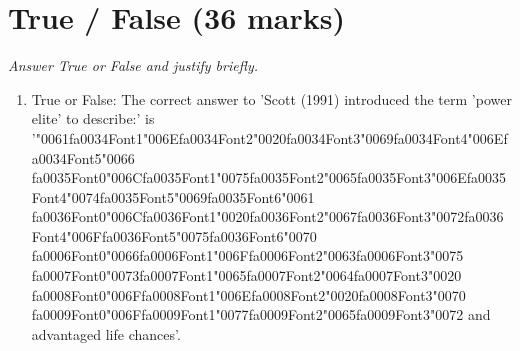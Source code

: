 \documentclass[12pt]{article}
\begin{document}
\section*{True / False (36 marks)}
\textit{Answer True or False and justify briefly.}
\begin{enumerate}[label=\arabic*.]
\item True or False: The correct answer to 'Scott (1991) introduced the term 'power elite' to describe:' is '{\char"0061}{\csname fa0034Font1\endcsname\char"006E}{\csname fa0034Font2\endcsname\char"0020}{\csname fa0034Font3\endcsname\char"0069}{\csname fa0034Font4\endcsname\char"006E}{\csname fa0034Font5\endcsname\char"0066} {\csname fa0035Font0\endcsname\char"006C}{\csname fa0035Font1\endcsname\char"0075}{\csname fa0035Font2\endcsname\char"0065}{\csname fa0035Font3\endcsname\char"006E}{\csname fa0035Font4\endcsname\char"0074}{\csname fa0035Font5\endcsname\char"0069}{\csname fa0035Font6\endcsname\char"0061} {\csname fa0036Font0\endcsname\char"006C}{\csname fa0036Font1\endcsname\char"0020}{\csname fa0036Font2\endcsname\char"0067}{\csname fa0036Font3\endcsname\char"0072}{\csname fa0036Font4\endcsname\char"006F}{\csname fa0036Font5\endcsname\char"0075}{\csname fa0036Font6\endcsname\char"0070} {\csname fa0006Font0\endcsname\char"0066}{\csname fa0006Font1\endcsname\char"006F}{\csname fa0006Font2\endcsname\char"0063}{\csname fa0006Font3\endcsname\char"0075} {\csname fa0007Font0\endcsname\char"0073}{\csname fa0007Font1\endcsname\char"0065}{\csname fa0007Font2\endcsname\char"0064}{\csname fa0007Font3\endcsname\char"0020} {\csname fa0008Font0\endcsname\char"006F}{\csname fa0008Font1\endcsname\char"006E}{\csname fa0008Font2\endcsname\char"0020}{\csname fa0008Font3\endcsname\char"0070} {\csname fa0009Font0\endcsname\char"006F}{\csname fa0009Font1\endcsname\char"0077}{\csname fa0009Font2\endcsname\char"0065}{\csname fa0009Font3\endcsname\char"0072} and advantaged life chances'.

\end{enumerate}
\end{document}
